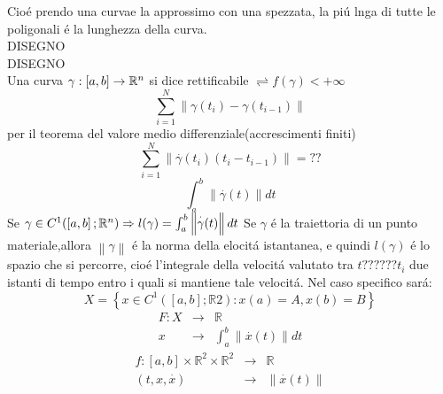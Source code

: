 Cio\'e prendo una curvae la approssimo con una spezzata, la pi\'u lnga di tutte le poligonali \'e la lunghezza della curva.\\
DISEGNO\\
DISEGNO\\
Una curva $\gamma:\left[a,b\right]\to\mathbb{R}^n$ si dice rettificabile $\rightleftharpoons f(\gamma)<+\infty$
\observation
$$\sum\limits_{i=1}^{N}\left\| \gamma(t_i)-\gamma(t_{i-1}) \right\| $$
per il teorema del valore medio differenziale(accrescimenti finiti)
$$\sum\limits_{i=1}^{N}\left\| \overset{\cdot}{\gamma}(t_i)(t_i-t_{i-1})\right\| =??$$
$$\int_{a}^{b}\left\| \overset{\cdot}{\gamma}(t) \right\| dt$$
\proposition
Se $\gamma\in C^1(\left[a,b\right];\mathbb{R}^n)\Rightarrow l(\gamma)=\int_a^b\left\|\overset{\cdot}{\gamma}(t)\right\|dt$
\observation
Se $\gamma$ \'e la traiettoria di un punto materiale,allora $\left\|\gamma\right\|$ \'e la norma della elocit\'a istantanea, e quindi $l(\gamma)$ \'e lo spazio che si percorre, cio\'e l'integrale della velocit\'a valutato tra $t??????t_i$ due istanti di tempo entro i quali si mantiene tale velocit\'a.
\observation
Nel caso specifico sar\'a:
$$ X=\left\{ x\in C^1(\left[a,b\right];\mathbb{R}2): x(a)=A, x(b)=B \right\} $$
$$\begin{array}{ccc} 
F: X & \to & \mathbb{R} \\
x & \to & \int_{a}^b \left\|\overset{\cdot}{x}(t)\right\|dt
\end{array}$$
$$\begin{array}{ccc} 
f: \left[a,b\right]\times\mathbb{R}^2\times\mathbb{R}^2 & \to & \mathbb{R} \\
(t,x,\overset{\cdot}{x}) & \to &  \left\|\overset{\cdot}{x}(t)\right\|
\end{array}$$
